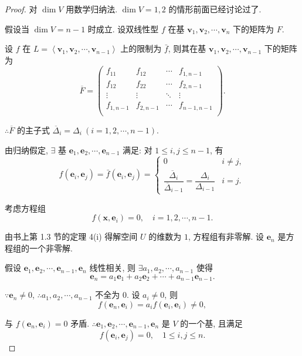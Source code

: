 \documentclass[color=black,device=normal,lang=cn,mode=geye]{elegantnote}
\begin{document}
\begin{proof}
    对 $\dim V$ 用数学归纳法. $\dim V=1,2$ 的情形前面已经讨论过了.

    假设当 $\dim V=n-1$ 时成立. 设双线性型 $f$ 在基 $\boldsymbol{v}_1,\boldsymbol{v}_2,\cdots,\boldsymbol{v}_n$ 下的矩阵为 $F$.

    设 $f$ 在 $L=\left<\boldsymbol{v}_1,\boldsymbol{v}_2,\cdots,\boldsymbol{v}_{n-1}\right>$ 上的限制为 $\bar{f}$, 则其在基 $\boldsymbol{v}_1,\boldsymbol{v}_2,\cdots,\boldsymbol{v}_{n-1}$ 下的矩阵为
    \[\overline{F}=\begin{pmatrix}
        f_{11} & f_{12} & \cdots & f_{1,n-1} \\
        f_{12} & f_{22} & \cdots & f_{2,n-1} \\
        \vdots & \vdots & \ddots & \vdots \\
        f_{1,n-1} & f_{2,n-1} & \cdots & f_{n-1,n-1} \\
    \end{pmatrix}.\]

    $\therefore\overline{F}$ 的主子式 $\overline{\Delta}_i=\Delta_i\ (i=1,2,\cdots,n-1)$.

    由归纳假定, $\exists$ 基 $\boldsymbol{e}_1,\boldsymbol{e}_2,\cdots,\boldsymbol{e}_{n-1}$ 满足: 对 $1\leq i,j\leq n-1$, 有
    \[f(\boldsymbol{e}_i,\boldsymbol{e}_j)=\bar{f}(\boldsymbol{e}_i,\boldsymbol{e}_j)=\begin{cases}
        0 & i\neq j, \\
        \dfrac{\overline{\Delta}_i}{\overline{\Delta}_{i-1}}=\dfrac{\Delta_i}{\Delta_{i-1}} & i=j.
    \end{cases}\]

    考虑方程组
    \[f(\boldsymbol{x},\boldsymbol{e}_i)=0,\quad i=1,2,\cdots,n-1.\]

    由书上第 1.3 节的定理 4(i) 得解空间 $U$ 的维数为 $1$, 方程组有非零解. 设 $\boldsymbol{e}_n$ 是方程组的一个非零解.

    假设 $\boldsymbol{e}_1,\boldsymbol{e}_2,\cdots,\boldsymbol{e}_{n-1},\boldsymbol{e}_n$ 线性相关, 则 $\exists a_1,a_2,\cdots,a_{n-1}$ 使得
    \[\boldsymbol{e}_n=a_1\boldsymbol{e}_1+a_2\boldsymbol{e}_2+\cdots+a_{n-1}\boldsymbol{e}_{n-1}.\]

    $\because\boldsymbol{e}_n\neq0$, $\therefore a_1,a_2,\cdots,a_{n-1}$ 不全为 $0$. 设 $a_i\neq0$, 则
    \[f(\boldsymbol{e}_n,\boldsymbol{e}_i)=a_if(\boldsymbol{e}_i,\boldsymbol{e}_i)\neq0,\]

    与 $f(\boldsymbol{e}_n,\boldsymbol{e}_i)=0$ 矛盾. $\therefore\boldsymbol{e}_1,\boldsymbol{e}_2,\cdots,\boldsymbol{e}_{n-1},\boldsymbol{e}_n$ 是 $V$ 的一个基, 且满足
    \[f(\boldsymbol{e}_i,\boldsymbol{e}_j)=0,\quad1\leq i,j\leq n.\]
    

\end{proof}
\end{document}
